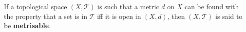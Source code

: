 If a topological space $(X, \mathcal{T})$ is such that a metric $d$ on $X$ can be found with the property that a set is in $\mathcal{T}$ iff it is open in $(X, d)$, then $(X, \mathcal{T})$ is said to be \textbf{metrisable}.
